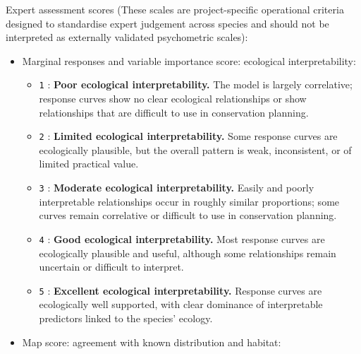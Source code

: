 \documentclass[
  openany]{book}
\let\OldTexttt\texttt
\renewcommand{\texttt}[1]{%
  \OldTexttt{\small #1}%
}
\begin{document}
\begin{enumerate}
  Expert assessment scores (These scales are project-specific operational criteria designed to standardise expert judgement across species and should not be interpreted as externally validated psychometric scales):

  \begin{itemize}
  \item
    Marginal responses and variable importance score: ecological interpretability:

    \begin{itemize}
    \item
      \texttt{1}: \textbf{Poor ecological interpretability.} The model is largely correlative; response curves show no clear ecological relationships or show relationships that are difficult to use in conservation planning.
    \item
      \texttt{2}: \textbf{Limited ecological interpretability.} Some response curves are ecologically plausible, but the overall pattern is weak, inconsistent, or of limited practical value.
    \item
      \texttt{3}: \textbf{Moderate ecological interpretability.} Easily and poorly interpretable relationships occur in roughly similar proportions; some curves remain correlative or difficult to use in conservation planning.
    \item
      \texttt{4}: \textbf{Good ecological interpretability.} Most response curves are ecologically plausible and useful, although some relationships remain uncertain or difficult to interpret.
    \item
      \texttt{5}: \textbf{Excellent ecological interpretability.} Response curves are ecologically well supported, with clear dominance of interpretable predictors linked to the species' ecology.
    \end{itemize}
  \item
    Map score: agreement with known distribution and habitat:


\end{itemize}
\end{enumerate}
\end{document}
